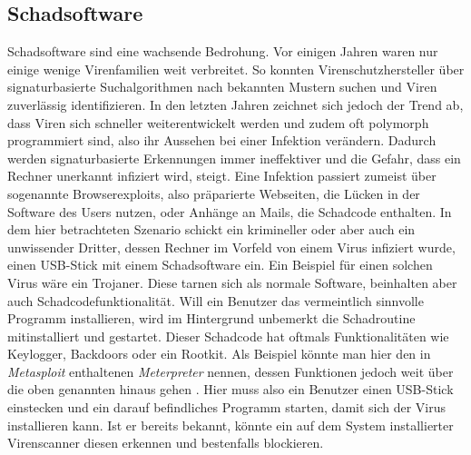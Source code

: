 \subsection{Schadsoftware}
Schadsoftware sind eine wachsende Bedrohung. Vor einigen Jahren waren nur einige wenige Virenfamilien weit verbreitet. So konnten Virenschutzhersteller über signaturbasierte Suchalgorithmen nach bekannten Mustern suchen und Viren zuverlässig identifizieren. In den letzten Jahren zeichnet sich jedoch der Trend ab, dass Viren sich schneller weiterentwickelt werden und zudem oft polymorph programmiert sind, also ihr Aussehen bei einer Infektion verändern. Dadurch werden signaturbasierte Erkennungen immer ineffektiver und die Gefahr, dass ein Rechner unerkannt infiziert wird, steigt. Eine Infektion passiert zumeist über sogenannte Browserexploits, also präparierte Webseiten, die Lücken in der Software des Users nutzen, oder Anhänge an Mails, die Schadcode enthalten. In dem hier betrachteten Szenario schickt ein krimineller oder aber auch ein unwissender Dritter, dessen Rechner im Vorfeld von einem Virus infiziert wurde, einen USB-Stick mit einem Schadsoftware ein. Ein Beispiel für einen solchen Virus wäre ein Trojaner. Diese tarnen sich als normale Software, beinhalten aber auch Schadcodefunktionalität. \cite{Stamp2006} Will ein Benutzer das vermeintlich sinnvolle Programm installieren, wird im Hintergrund unbemerkt die Schadroutine mitinstalliert und gestartet. Dieser Schadcode hat oftmals Funktionalitäten wie Keylogger, Backdoors oder ein Rootkit. Als Beispiel könnte man hier den in \textit{Metasploit}\cite{Metasploit} enthaltenen \textit{Meterpreter} nennen, dessen Funktionen jedoch weit über die oben genannten hinaus gehen \cite{Meterpreter}. Hier muss also ein Benutzer einen USB-Stick einstecken und ein darauf befindliches Programm starten, damit sich der Virus installieren kann. Ist er bereits bekannt, könnte ein auf dem System installierter Virenscanner diesen erkennen und bestenfalls blockieren.
			
